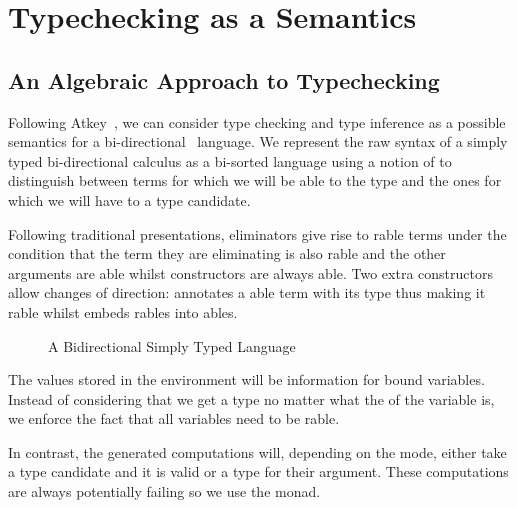 \chapter{Typechecking as a Semantics}


\section{An Algebraic Approach to Typechecking}\label{section:typechecking}

Following Atkey~\citeyear{atkey2015algebraic}, we can consider type checking
and type inference as a possible semantics for a bi-directional~\cite{pierce2000local}
language. We represent the raw syntax of a simply typed bi-directional calculus
as a bi-sorted language using a notion of  to distinguish between terms
for which we will be able to  the type and the ones for which we will
have to  a type candidate.

Following traditional presentations, eliminators give rise to rable
terms under the condition that the term they are eliminating is also rable
and the other arguments are able whilst constructors are always able.
Two extra constructors allow changes of direction:  annotates a able
term with its type thus making it rable whilst  embeds rables
into ables.



\begin{figure}[h]
\caption{A Bidirectional Simply Typed Language}
\end{figure}

The values stored in the environment will be  information for bound
variables. Instead of considering that we get a type no matter what the 
of the variable is, we enforce the fact that all variables need to be rable.


In contrast, the generated computations will, depending on the mode, either take a
type candidate and  it is valid or  a type for their argument.
These computations are always potentially failing so we use the  monad.

